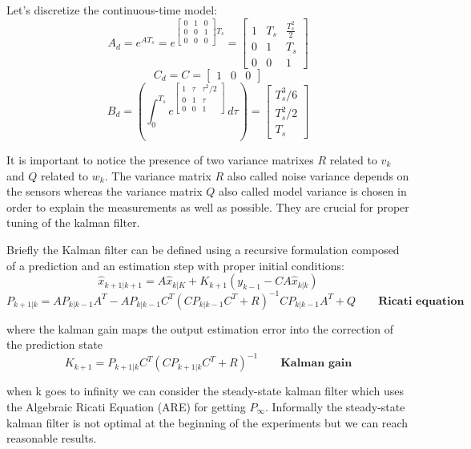 \documentclass[a4paper,12pt]{article}
\begin{document}
\noindent Let's discretize the continuous-time model:
\[
    A_d = e^{AT_s} = e^{\begin{bmatrix}  0&1&0 \\ 0&0&1\\0&0&0 \end{bmatrix}T_s} = \begin{bmatrix} 1&T_s&\frac{T_s^2}{2}\\0&1&T_s\\0&0&1 \end{bmatrix}
\]
\[
    C_d = C = \begin{bmatrix} 1&0&0 \end{bmatrix}
\]
\[
    B_d = \left (\int_{0}^{T_s} e^{\begin{bmatrix} 1&\tau&\tau^2/2\\0&1&\tau\\0&0&1 \end{bmatrix}} \,d\tau \right) = \begin{bmatrix} T_s^3/6\\T_s^2/2\\T_s \end{bmatrix}
\]

It is important to notice the presence of two variance matrixes $R$ related to $v_k$ and $Q$ related to $w_k$. The variance matrix $R$ also called noise variance depends on the sensors whereas the variance
matrix $Q$ also called model variance is chosen in order to explain the measurements as well as
possible. They are crucial for proper tuning of the kalman filter.

\bigskip
\noindent Briefly the Kalman filter can be defined using a recursive formulation composed of a prediction and an estimation step with proper initial conditions:
\[
    \hat{x}_{k+1|k+1} = A\hat{x}_{k|K} + K_{k+1}(y_{k-1} - CA\hat{x}_{k|k})
\]   
\[
    P_{k+1|k} = AP_{k|k-1}A^T - AP_{k|k-1}C^T(CP_{k|k-1}C^T + R)^{-1}CP_{k|k-1}A^T+Q \qquad \textbf{Ricati equation}
\]

\bigskip
where the kalman gain maps the output estimation error into the correction of the prediction state
\[
    K_{k+1} = P_{k+1|k}C^T(CP_{k+1|k}C^T+R)^{-1} \qquad \textbf{Kalman gain}
\]

when k goes to infinity we can consider the steady-state kalman filter which uses the Algebraic Ricati Equation (ARE) for getting $P_{\infty}$. Informally the steady-state kalman filter is not optimal at the beginning of the experiments but we can reach reasonable results.
\end{document}
